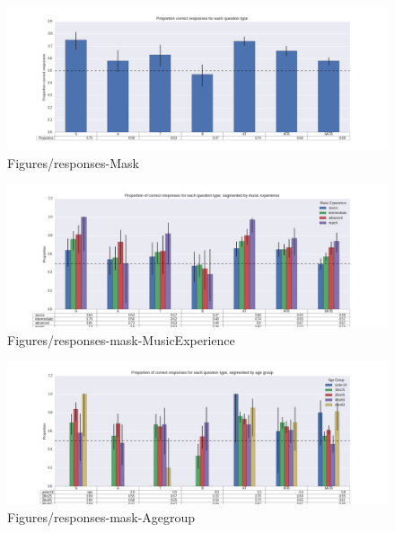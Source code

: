 \documentclass[dissertation.tex]{subfiles}
\begin{document}
\begin{figure}[htpb]
  \centering
  \includegraphics[width=1.0\linewidth]{Figures/responses-mask.png}
  \caption{Figures/responses-Mask}
  \label{fig:responses-mask}
\end{figure}

\begin{figure}[htpb]
  \centering
  \includegraphics[width=1.0\linewidth]{Figures/responses-mask-musicExperience.png}
  \caption{Figures/responses-mask-MusicExperience}
  \label{fig:responses-mask-musicExperience}
\end{figure}

\begin{figure}[htpb]
  \centering
  \includegraphics[width=1.0\linewidth]{Figures/responses-mask-agegroup.png}
  \caption{Figures/responses-mask-Agegroup}
  \label{fig:responses-mask-agegroup}
\end{figure}
\end{document}
